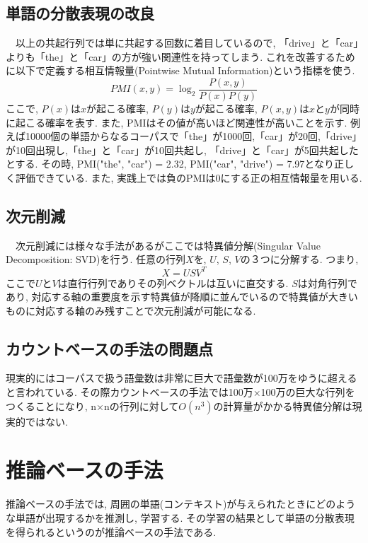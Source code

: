 \documentclass[twocolumn]{jarticle}
\begin{document}
\subsection{単語の分散表現の改良}
　以上の共起行列では単に共起する回数に着目しているので, 「drive」と「car」よりも「the」と「car」の方が強い関連性を持ってしまう. これを改善するために以下で定義する相互情報量(Pointwise Mutual Information)という指標を使う.
\begin{equation}
  PMI(x, y) = \log_{2} \frac{P(x, y)}{P(x)P(y)}
\end{equation}
ここで, ${P(x)}$は${x}$が起こる確率, ${P(y)}$は${y}$が起こる確率, ${P(x, y)}$は${x}$と${y}$が同時に起こる確率を表す. また, PMIはその値が高いほど関連性が高いことを示す. 例えば10000個の単語からなるコーパスで「the」が1000回,「car」が20回,「drive」が10回出現し,「the」と「car」が10回共起し, 「drive」と「car」が5回共起したとする. その時, PMI("the", "car") = 2.32, PMI("car", "drive") = 7.97となり正しく評価できている. また, 実践上では負のPMIは0にする正の相互情報量を用いる.

\subsection{次元削減}
　次元削減には様々な手法があるがここでは特異値分解(Singular Value Decomposition: SVD)を行う. 任意の行列${X}$を, ${U}$, ${S}$, ${V}$の３つに分解する. つまり,
\begin{equation}
  X = USV^T
\end{equation}
ここで${U}$と${V}$は直行行列でありその列ベクトルは互いに直交する. ${S}$は対角行列であり, 対応する軸の重要度を示す特異値が降順に並んでいるので特異値が大きいものに対応する軸のみ残すことで次元削減が可能になる.

\subsection{カウントベースの手法の問題点}
現実的にはコーパスで扱う語彙数は非常に巨大で語彙数が100万をゆうに超えると言われている. その際カウントベースの手法では100万×100万の巨大な行列をつくることになり, n×nの行列に対して${O(n^3)}$の計算量がかかる特異値分解は現実的ではない.

\section{推論ベースの手法}
推論ベースの手法では, 周囲の単語(コンテキスト)が与えられたときにどのような単語が出現するかを推測し, 学習する. その学習の結果として単語の分散表現を得られるというのが推論ベースの手法である.
\end{document}
